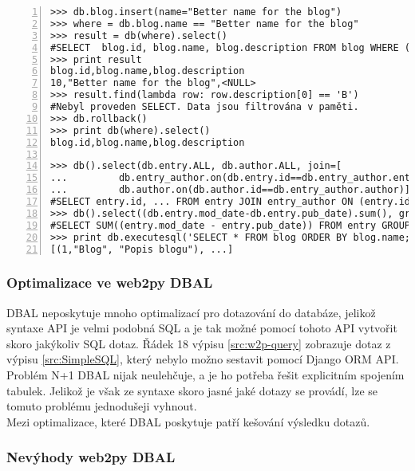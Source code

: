 \documentclass[ing,male,java,dept456]{diploma}						%
\begin{document}
\begin{lstlisting}[style=custompython, numbers=left, label=src:w2p-query, caption={Ukázka získávání dat z databáze}]
>>> db.blog.insert(name="Better name for the blog")
>>> where = db.blog.name == "Better name for the blog"
>>> result = db(where).select()
#SELECT  blog.id, blog.name, blog.description FROM blog WHERE (blog.name = 'Better name for the blog'); 
>>> print result
blog.id,blog.name,blog.description
10,"Better name for the blog",<NULL>
>>> result.find(lambda row: row.description[0] == 'B')
#Nebyl proveden SELECT. Data jsou filtrována v paměti.
>>> db.rollback()
>>> print db(where).select()
blog.id,blog.name,blog.description

>>> db().select(db.entry.ALL, db.author.ALL, join=[
...			db.entry_author.on(db.entry.id==db.entry_author.entry),
...			db.author.on(db.author.id==db.entry_author.author)])
#SELECT entry.id, ... FROM entry JOIN entry_author ON (entry.id = entry_author.entry) JOIN author ON (author.id = entry_author.author) WHERE (entry.id IS NOT NULL);
>>> db().select((db.entry.mod_date-db.entry.pub_date).sum(), groupby=db.entry.blog_id)
#SELECT SUM((entry.mod_date - entry.pub_date)) FROM entry GROUP BY entry.blog_id;
>>> print db.executesql('SELECT * FROM blog ORDER BY blog.name;')
[(1,"Blog", "Popis blogu"), ...]
\end{lstlisting}

\subsubsection{Optimalizace ve web2py DBAL}
DBAL neposkytuje mnoho optimalizací pro dotazování do databáze, jelikož syntaxe API je velmi podobná SQL a je tak možné pomocí tohoto API vytvořit skoro jakýkoliv SQL dotaz. Řádek 18 výpisu \ref{src:w2p-query} zobrazuje dotaz z výpisu \ref{src:SimpleSQL}, který nebylo možno sestavit pomocí Django ORM API.  \\
Problém N+1 DBAL nijak neulehčuje, a je ho potřeba řešit explicitním spojením tabulek. Jelikož je však ze syntaxe skoro jasné jaké dotazy se provádí, lze se tomuto problému jednodušeji vyhnout. \\
Mezi optimalizace, které DBAL poskytuje patří kešování výsledku dotazů. \\

\subsubsection{Nevýhody web2py DBAL}
\end{document}
